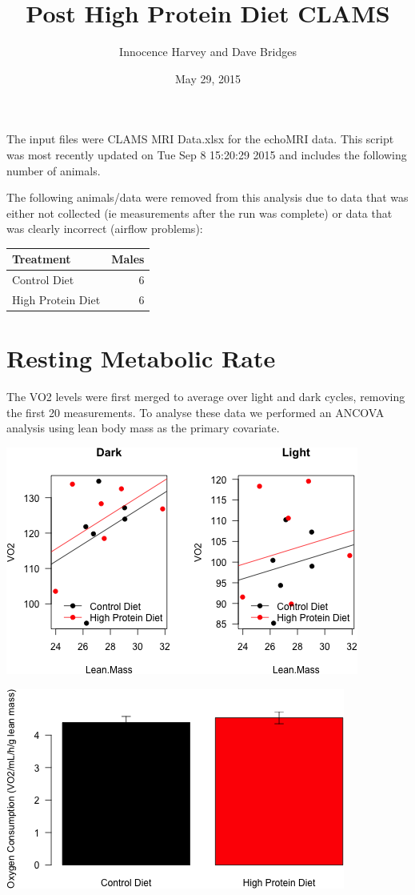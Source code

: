\documentclass[]{article}
\title{Post High Protein Diet CLAMS}
\author{Innocence Harvey and Dave Bridges}
\date{May 29, 2015}
\begin{document}
\maketitle


The input files were CLAMS MRI Data.xlsx for the echoMRI data. This
script was most recently updated on Tue Sep 8 15:20:29 2015 and includes
the following number of animals.

The following animals/data were removed from this analysis due to data
that was either not collected (ie measurements after the run was
complete) or data that was clearly incorrect (airflow problems):

\begin{longtable}[c]{@{}lr@{}}
\toprule
Treatment & Males\tabularnewline
\midrule
\endhead
Control Diet & 6\tabularnewline
High Protein Diet & 6\tabularnewline
\bottomrule
\end{longtable}

\section{Resting Metabolic Rate}\label{resting-metabolic-rate}

The VO2 levels were first merged to average over light and dark cycles,
removing the first 20 measurements. To analyse these data we performed
an ANCOVA analysis using lean body mass as the primary covariate.

\includegraphics{figures/VO2-by-lean-1.png}

\includegraphics{figures/vo2-barplot-1.png}
\end{document}

